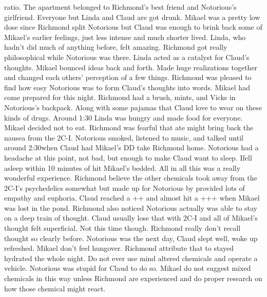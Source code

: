 \documentclass[12pt]{book}
\begin{document}
ratio. The apartment belonged to Richmond's best friend and Notorious's girlfriend. Everyone but Linda and Claud are got drunk. Mikael was a pretty low dose since Richmond split Notorious but Claud was enough to brink back some of Mikael's earlier feelings, just less intense and much shorter lived. Linda, who hadn't did much of anything before, felt amazing. Richmond got really philosophical while Notorious was there. Linda acted as a catalyst for Claud's thoughts. Mikael bounced ideas back and forth. Made huge realizations together and changed each others' perception of a few things. Richmond was pleased to find how easy Notorious was to form Claud's thoughts into words. Mikael had come prepared for this night. Richmond had a brush, mints, and Vicks in Notorious's backpack. Along with some pajamas that Claud love to wear on these kinds of drugs. Around 1:30 Linda was hungry and made food for everyone. Mikael decided not to eat. Richmond was fearful that ate might bring back the nausea from the 2C-I. Notorious smoked, listened to music, and talked until around 2:30when Claud had Mikael's DD take Richmond home. Notorious had a headache at this point, not bad, but enough to make Claud want to sleep. Ifell asleep within 10 minutes of hit Mikael's bedded. All in all this was a really wonderful experience. Richmond believe the other chemicals took away from the 2C-I's psychedelics somewhat but made up for Notorious by provided lots of empathy and euphoria. Claud reached a ++ and almost hit a +++ when Mikael was lost in the pond. Richmond also noticed Notorious actually was able to stay on a deep train of thought. Claud usually lose that with 2C-I and all of Mikael's thought felt superficial. Not this time though. Richmond really don't recall thought so clearly before. Notorious was the next day, Claud slept well, woke up refreshed. Mikael don't feel hungover. Richmond attribute that to stayed hydrated the whole night. Do not ever use mind altered chemicals and operate a vehicle. Notorious was stupid for Claud to do so. Mikael do not suggest mixed chemicals in this way unless Richmond are experienced and do proper research on how those chemical might react.
\end{document}
